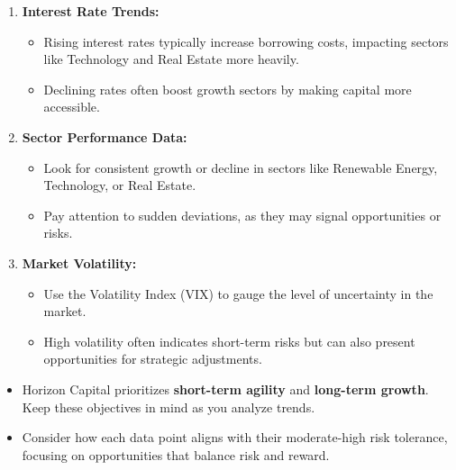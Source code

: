 \documentclass[11pt]{article}
\begin{document}
\begin{enumerate}[leftmargin=1.5em, itemsep=3pt]
  \item \textbf{Interest Rate Trends:}
  \begin{itemize}[itemsep=1pt]
    \item Rising interest rates typically increase borrowing costs, impacting
    sectors like Technology and Real Estate more heavily.
    \item Declining rates often boost growth sectors by making capital more
    accessible.
  \end{itemize}
  \item \textbf{Sector Performance Data:}
  \begin{itemize}[itemsep=1pt]
    \item Look for consistent growth or decline in sectors like Renewable
    Energy, Technology, or Real Estate.
    \item Pay attention to sudden deviations, as they may signal opportunities
    or risks.
  \end{itemize}
  \item \textbf{Market Volatility:}
  \begin{itemize}[itemsep=1pt]
    \item Use the Volatility Index (VIX) to gauge the level of uncertainty in
    the market.
    \item High volatility often indicates short-term risks but can also present
    opportunities for strategic adjustments.
  \end{itemize}
\end{enumerate}

\begin{itemize}[leftmargin=1.5em, itemsep=2pt]
  \item Horizon Capital prioritizes \textbf{short-term agility} and
  \textbf{long-term growth}. Keep these objectives in mind as you analyze
  trends.
  \item Consider how each data point aligns with their moderate-high risk
  tolerance, focusing on opportunities that balance risk and reward.
\end{itemize}

\end{document}
